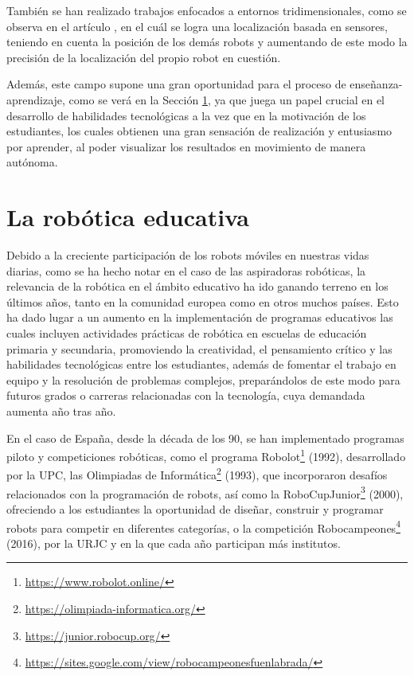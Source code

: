 También se han realizado trabajos enfocados a entornos tridimensionales, como se
observa en el artículo \cite{Fox2000}, en el cuál se logra una localización
basada en sensores, teniendo en cuenta la posición de los demás robots y
aumentando de este modo la precisión de la localización del propio robot en
cuestión.

Además, este campo supone una gran oportunidad para el proceso de
enseñanza-aprendizaje, como se verá en la Sección \ref{sec:robotica_educativa},
ya que juega un papel crucial en el desarrollo de habilidades tecnológicas a la
vez que en la motivación de los estudiantes, los cuales obtienen una gran
sensación de realización y entusiasmo por aprender, al poder visualizar los
resultados en movimiento de manera autónoma.



\section{La robótica educativa}
\label{sec:robotica_educativa} %

Debido a la creciente participación de los robots móviles en nuestras vidas
diarias, como se ha hecho notar en el caso de las aspiradoras robóticas, la
relevancia de la robótica en el ámbito educativo ha ido ganando terreno en los
últimos años, tanto en la comunidad europea como en otros muchos países.
Esto ha dado lugar a un aumento en la implementación de programas educativos las
cuales incluyen actividades prácticas de robótica en escuelas de educación
primaria y secundaria, promoviendo la creatividad, el pensamiento crítico y las
habilidades tecnológicas entre los estudiantes, además de fomentar el trabajo en
equipo y la resolución de problemas complejos, preparándolos de este modo para
futuros grados o carreras relacionadas con la tecnología, cuya demandada aumenta
año tras año.

En el caso de España, desde la década de los 90, se han implementado programas
piloto y competiciones robóticas, como el programa Robolot\footnote{
\url{https://www.robolot.online/}} (1992), desarrollado por la UPC, las
Olimpiadas de Informática\footnote{\url{https://olimpiada-informatica.org/}}
(1993), que incorporaron desafíos relacionados con la programación de robots,
así como la RoboCupJunior\footnote{\url{https://junior.robocup.org/}} (2000),
ofreciendo a los estudiantes la oportunidad de diseñar, construir y programar
robots para competir en diferentes categorías, o la competición
Robocampeones\footnote{
\url{https://sites.google.com/view/robocampeonesfuenlabrada/}} (2016), por la
URJC y en la que cada año participan más institutos.

